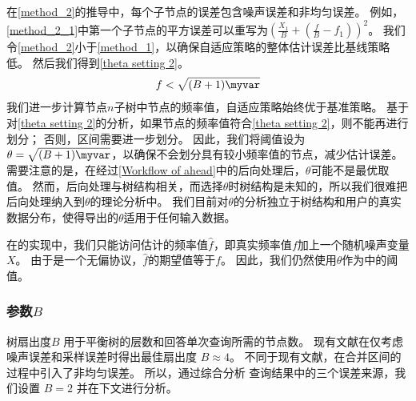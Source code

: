 在\autoref{method_2}的推导中，每个子节点的误差包含噪声误差和非均匀误差。
例如，\autoref{method_2_1}中第一个子节点的平方误差可以重写为$\left(\frac{X_{1}}{B}+\left(\frac{f}{B}-f_{1}\right)\right)^{2}$。
我们令\autoref{method_2}小于\autoref{method_1}，以确保自适应策略的整体估计误差比基线策略低。
然后我们得到\autoref{theta setting 2}。
\begin{align}
    f < \sqrt{(B+1)\myvar}
    \label{theta setting 2}
\end{align}
我们进一步计算节点$n$子树中节点的频率值，自适应策略始终优于基准策略。
基于对\autoref{theta setting 2}的分析，如果节点的频率值符合\autoref{theta setting 2}，则不能再进行划分；
否则，区间需要进一步划分。
因此，我们将阈值设为$\theta=\sqrt{(B+1)\myvar}$，以确保\myahead 不会划分具有较小频率值的节点，减少估计误差。
需要注意的是，在经过\autoref{Workflow of ahead}中的后向处理后，$\theta$可能不是最优取值。
然而，后向处理与树结构相关，而选择$\theta$时树结构是未知的，所以我们很难把后向处理纳入到$\theta$的理论分析中。
我们目前对$\theta$的分析独立于树结构和用户的真实数据分布，使得导出的$\theta$适用于任何输入数据。

在\myahead 的实现中，我们只能访问估计的频率值$\hat{f}$，即真实频率值$f$加上一个随机噪声变量$X$。
由于\oue 是一个无偏协议，$\hat{f}$的期望值等于$f$。
因此，我们仍然使用$\theta$作为\myahead 中的阈值。

\subsubsection{参数$B$}
树扇出度$B$ 用于平衡树的层数和回答单次查询所需的节点数。
现有文献{\rm\cite{wang2019answering, cormode2019answering}}在仅考虑噪声误差和采样误差时得出最佳扇出度 $B \approx 4$。
不同于现有文献，\myahead 在合并区间的过程中引入了非均匀误差。
所以，通过综合分析 \myahead 查询结果中的三个误差来源，我们设置 $B=2$ 并在下文进行分析。

